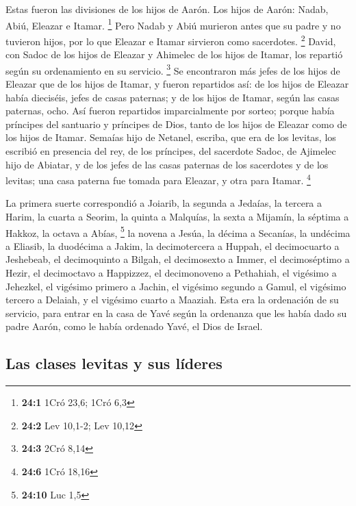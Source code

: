 \begin{paracol}{2}
 Estas fueron las divisiones de los hijos de Aarón. Los
hijos de Aarón: Nadab, Abiú, Eleazar e Itamar. \footnote{\textbf{24:1}
  1Cró 23,6; 1Cró 6,3}  Pero Nadab y Abiú murieron antes
que su padre y no tuvieron hijos, por lo que Eleazar e Itamar sirvieron
como sacerdotes. \footnote{\textbf{24:2} Lev 10,1-2; Lev 10,12}
 David, con Sadoc de los hijos de Eleazar y Ahimelec de
los hijos de Itamar, los repartió según su ordenamiento en su servicio.
\footnote{\textbf{24:3} 2Cró 8,14}  Se encontraron más
jefes de los hijos de Eleazar que de los hijos de Itamar, y fueron
repartidos así: de los hijos de Eleazar había dieciséis, jefes de casas
paternas; y de los hijos de Itamar, según las casas paternas, ocho.
 Así fueron repartidos imparcialmente por sorteo; porque
había príncipes del santuario y príncipes de Dios, tanto de los hijos de
Eleazar como de los hijos de Itamar.  Semaías hijo de
Netanel, escriba, que era de los levitas, los escribió en presencia del
rey, de los príncipes, del sacerdote Sadoc, de Ajimelec hijo de Abiatar,
y de los jefes de las casas paternas de los sacerdotes y de los levitas;
una casa paterna fue tomada para Eleazar, y otra para Itamar.
\footnote{\textbf{24:6} 1Cró 18,16}

 La primera suerte correspondió a Joiarib, la segunda a
Jedaías,  la tercera a Harim, la cuarta a Seorim,
 la quinta a Malquías, la sexta a Mijamín, 
la séptima a Hakkoz, la octava a Abías, \footnote{\textbf{24:10} Luc 1,5}
 la novena a Jesúa, la décima a Secanías, 
la undécima a Eliasib, la duodécima a Jakim,  la
decimotercera a Huppah, el decimocuarto a Jeshebeab,  el
decimoquinto a Bilgah, el decimosexto a Immer,  el
decimoséptimo a Hezir, el decimoctavo a Happizzez,  el
decimonoveno a Pethahiah, el vigésimo a Jehezkel,  el
vigésimo primero a Jachin, el vigésimo segundo a Gamul, 
el vigésimo tercero a Delaiah, y el vigésimo cuarto a Maaziah.
 Esta era la ordenación de su servicio, para entrar en la
casa de Yavé según la ordenanza que les había dado su padre Aarón, como
le había ordenado Yavé, el Dios de Israel.

\hypertarget{las-clases-levitas-y-sus-luxedderes}{%
\subsection{Las clases levitas y sus
líderes}\label{las-clases-levitas-y-sus-luxedderes}}


\end{paracol}
